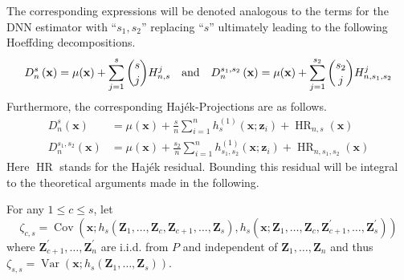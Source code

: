 \documentclass[letterpaper,10pt]{article}
\numberwithin{equation}{section}
\numberwithin{theorem}{section}
\numberwithin{remark}{section}
\numberwithin{example}{section}
\theoremstyle{definition}
\newcommand{\1}{\mathbb{1}}
\begin{document}
The corresponding expressions will be denoted analogous to the terms for the DNN estimator with ``$s_1, s_2$'' replacing ``$s$'' ultimately leading to the following Hoeffding decompositions.
\begin{equation}
	D_n^s\left(\mathbf{x}\right)
	= \mu(\mathbf{x}) + \sum_{j = 1}^{s}\binom{s}{j}H_{n,s}^{j}\\
	\quad \text{and} \quad
	D_n^{s_1,s_2}\left(\mathbf{x}\right)
	= \mu(\mathbf{x}) + \sum_{j = 1}^{s_2}\binom{s_2}{j}H_{n,s_1, s_2}^{j}
\end{equation}
Furthermore, the corresponding Haj\'ek-Projections are as follows.
\begin{equation}
	\begin{aligned}
		D_n^s\left(\mathbf{x}\right)
		 & = \mu(\mathbf{x}) + \frac{s}{n}\sum_{i = 1}^{n}h^{(1)}_{s}(\mathbf{x}; \mathbf{z}_{i})
		+ \operatorname{HR}_{n, s}(\mathbf{x})                                                              \\
		D_n^{s_1,s_2}\left(\mathbf{x}\right)
		 & = \mu(\mathbf{x}) + \frac{s_2}{n}\sum_{i = 1}^{n} h^{(1)}_{s_1, s_2}(\mathbf{x}; \mathbf{z}_{i})
		+ \operatorname{HR}_{n, s_1, s_2}(\mathbf{x})
	\end{aligned}
\end{equation}
Here $\operatorname{HR}$ stands for the Haj\'ek residual.
Bounding this residual will be integral to the theoretical arguments made in the following.

For any $1 \leq c \leq s$, let
\begin{equation}
	\zeta_{c,s}
	= \operatorname{Cov}\left(\mathbf{x}; h_s\left(\mathbf{Z}_1, \ldots, \mathbf{Z}_c, \mathbf{Z}_{c+1}, \ldots, \mathbf{Z}_s\right),
	h_s\left(\mathbf{x}; \mathbf{Z}_1, \ldots, \mathbf{Z}_c, \mathbf{Z}_{c+1}^{\prime}, \ldots, \mathbf{Z}_s^{\prime}\right)\right)
\end{equation}
where $\mathbf{Z}_{c+1}^{\prime}, \ldots, \mathbf{Z}_n^{\prime}$ are i.i.d. from $P$ and independent of $\mathbf{Z}_1, \ldots, \mathbf{Z}_n$ and thus
$\zeta_{s,s} = \operatorname{Var}\left(\mathbf{x}; h_s\left(\mathbf{Z}_1, \ldots, \mathbf{Z}_s\right)\right).$


\newpage
\end{document}
